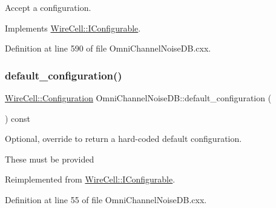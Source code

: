 Accept a configuration. 



Implements \hyperlink{class_wire_cell_1_1_i_configurable_a57ff687923a724093df3de59c6ff237d}{Wire\+Cell\+::\+I\+Configurable}.



Definition at line 590 of file Omni\+Channel\+Noise\+D\+B.\+cxx.

\mbox{\label{class_wire_cell_1_1_sig_proc_1_1_omni_channel_noise_d_b_af33aa262d6af04f4252abef453156799}} 
\subsubsection{\texorpdfstring{default\+\_\+configuration()}{default\_configuration()}}
{\footnotesize\ttfamily \hyperlink{namespace_wire_cell_a9f705541fc1d46c608b3d32c182333ee}{Wire\+Cell\+::\+Configuration} Omni\+Channel\+Noise\+D\+B\+::default\+\_\+configuration (\begin{DoxyParamCaption}{ }\end{DoxyParamCaption}) const\hspace{0.3cm}{\ttfamily [virtual]}}



Optional, override to return a hard-\/coded default configuration. 

These must be provided 

Reimplemented from \hyperlink{class_wire_cell_1_1_i_configurable_a54841b2da3d1ea02189478bff96f7998}{Wire\+Cell\+::\+I\+Configurable}.



Definition at line 55 of file Omni\+Channel\+Noise\+D\+B.\+cxx.


